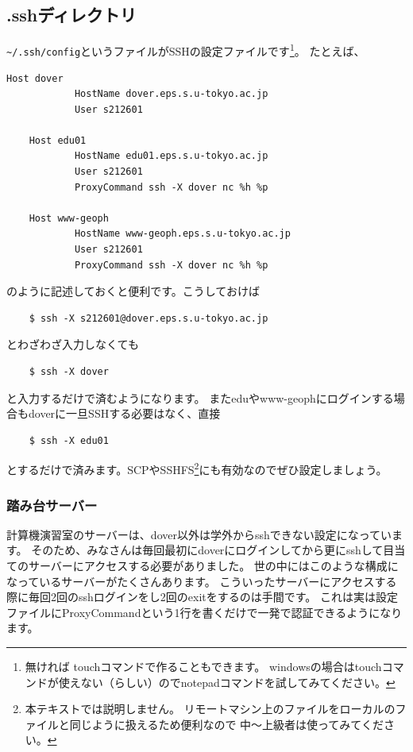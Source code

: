 \documentclass[a4j]{ltjreport}
\begin{document}
    \subsection{.sshディレクトリ}
    \verb|~/.ssh/config|というファイルがSSHの設定ファイルです\footnote{無ければ
    touchコマンドで作ることもできます。
    windowsの場合はtouchコマンドが使えない（らしい）のでnotepadコマンドを試してみてください。}。
    たとえば、
    \begin{Verbatim}[baselinestretch=0.5]
    Host dover
            HostName dover.eps.s.u-tokyo.ac.jp
            User s212601

    Host edu01
            HostName edu01.eps.s.u-tokyo.ac.jp
            User s212601
            ProxyCommand ssh -X dover nc %h %p

    Host www-geoph
            HostName www-geoph.eps.s.u-tokyo.ac.jp
            User s212601
            ProxyCommand ssh -X dover nc %h %p
    \end{Verbatim}
    のように記述しておくと便利です。こうしておけば
    \begin{verbatim}
    $ ssh -X s212601@dover.eps.s.u-tokyo.ac.jp
    \end{verbatim}
    とわざわざ入力しなくても
    \begin{verbatim}
    $ ssh -X dover
    \end{verbatim}
    と入力するだけで済むようになります。
    またeduやwww-geophにログインする場合もdoverに一旦SSHする必要はなく、直接
    \begin{verbatim}
    $ ssh -X edu01
    \end{verbatim}
    とするだけで済みます。SCPやSSHFS\footnote{本テキストでは説明しません。
    リモートマシン上のファイルをローカルのファイルと同じように扱えるため便利なので
    中〜上級者は使ってみてください。}にも有効なのでぜひ設定しましょう。

    \subsubsection{踏み台サーバー}
    計算機演習室のサーバーは、dover以外は学外からsshできない設定になっています。
    そのため、みなさんは毎回最初にdoverにログインしてから更にsshして目当てのサーバーにアクセスする必要がありました。
    世の中にはこのような構成になっているサーバーがたくさんあります。
    こういったサーバーにアクセスする際に毎回2回のsshログインをし2回のexitをするのは手間です。
    これは実は設定ファイルにProxyCommandという1行を書くだけで一発で認証できるようになります。
\end{document}
